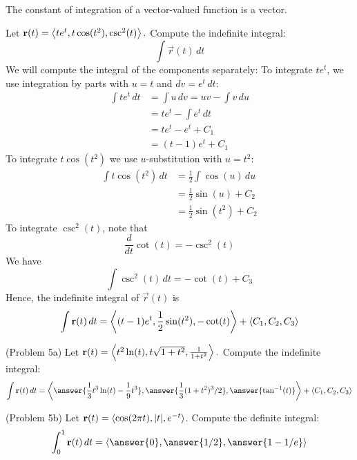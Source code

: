 \documentclass[handout]{ximera}
\begin{document}
\begin{remark}
The constant of integration of a vector-valued function is a vector.
\end{remark}

\begin{example}[Example 5]
Let $\mathbf r(t) = \left\langle te^t,t\cos(t^2),\csc^2(t)\right\rangle.$ Compute the indefinite integral:
\[
\int \vec r(t) \, dt
\]
We will compute the integral of the components separately:
To integrate $te^t$, we use integration by parts with $u = t$ and $dv = e^t \, dt$:
\begin{align*}
\int te^t \, dt &= \int u \, dv = uv - \int v \, du\\
                 &= te^t - \int e^t \, dt\\
                 & = te^t - e^t + C_1\\
                 & = (t-1)e^t + C_1
\end{align*}
To integrate $t\cos(t^2)$ we use $u$-substitution with $ u = t^2$:
\begin{align*}
\int t\cos(t^2) \, dt &= \frac12 \int \cos(u) \, du \\
                 &= \frac12 \sin(u) + C_2\\
                 & = \frac12 \sin(t^2) + C_2
\end{align*}
To integrate $\csc^2(t)$, note that
\[
\frac{d}{dt} \cot(t) = -\csc^2(t)
\]
We have
\[
\int \csc^2(t) \, dt = -\cot(t) + C_3
\]
Hence, the indefinite integral of $\vec r(t)$ is
\[
\int \mathbf r(t) \, dt = \left\langle (t-1)e^t,\frac12 \sin(t^2),-\cot(t)\right\rangle + \left\langle C_1, C_2, C_3\right\rangle
\]

\end{example}

\begin{problem}(Problem 5a)
Let $\mathbf r(t) = \left\langle t^2\ln(t),t\sqrt{1+t^2},\frac{1}{1+t^2}\right\rangle.$ Compute the indefinite integral:
\[
\int \vec r(t) \, dt = \vector{\answer{\frac13 t^3 \ln(t) - \frac19 t^3},\answer{\frac13 (1+t^2)^3/2},\answer{\tan^{-1}(t)}} + \vector{C_1, C_2, C_3}
\]

\end{problem}

\begin{problem}(Problem 5b)
Let $\mathbf r(t) = \left\langle \cos(2\pi t),|t|,e^{-t}\right\rangle$. Compute the definite integral:
\[
\int_0^1 \vec r(t) \, dt = \vector{\answer{0}, \answer{1/2}, \answer{1 - 1/e}}
\]
\end{problem}
\end{document}
